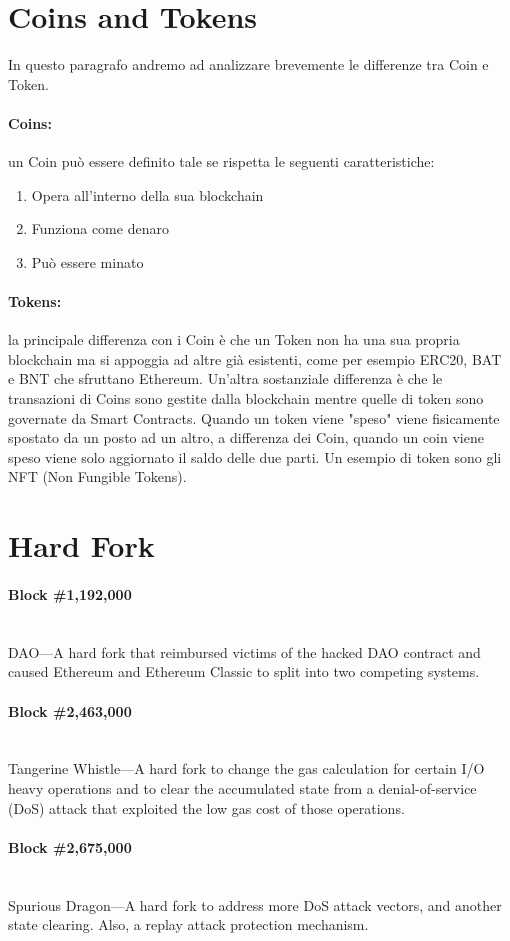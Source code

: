 \section{Coins and Tokens}
In questo paragrafo andremo ad analizzare brevemente le differenze tra Coin e Token.

\paragraph{Coins:}
un Coin può essere definito tale se rispetta le seguenti caratteristiche:

\begin{enumerate}
      \item Opera all'interno della sua blockchain
      \item Funziona come denaro
      \item Può essere minato
\end{enumerate}

\paragraph{Tokens:}
la principale differenza con i Coin è che un Token non ha una sua propria blockchain
ma si appoggia ad altre già esistenti, come per esempio ERC20, BAT e BNT che
sfruttano Ethereum. Un'altra sostanziale differenza è che le transazioni di Coins
sono gestite dalla blockchain mentre quelle di token sono governate da Smart Contracts.
Quando un token viene "speso" viene fisicamente spostato da un posto ad un altro,
a differenza dei Coin, quando un coin viene speso viene solo aggiornato il saldo
delle due parti. Un esempio di token sono gli NFT (Non Fungible Tokens).

\section{Hard Fork}

\paragraph{Block \#1,192,000} \ \\
DAO—A hard fork that reimbursed victims of the hacked DAO contract and
caused Ethereum and Ethereum Classic to split into two competing systems.

\paragraph{Block \#2,463,000} \ \\
Tangerine Whistle—A hard fork to change the gas calculation for certain I/O
heavy operations and to clear the accumulated state from a denial-of-service
(DoS) attack that exploited the low gas cost of those operations.

\paragraph{Block \#2,675,000} \ \\
Spurious Dragon—A hard fork to address more DoS attack vectors, and another
state clearing. Also, a replay attack protection mechanism.